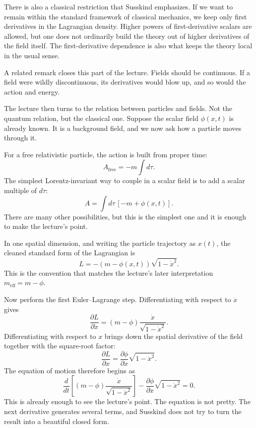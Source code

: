 There is also a classical restriction that Susskind emphasizes. If we want to remain within the standard framework of classical mechanics, we keep only first derivatives in the Lagrangian density. Higher powers of first-derivative scalars are allowed, but one does not ordinarily build the theory out of higher derivatives of the field itself. The first-derivative dependence is also what keeps the theory local in the usual sense.

A related remark closes this part of the lecture. Fields should be continuous. If a field were wildly discontinuous, its derivatives would blow up, and so would the action and energy.

The lecture then turns to the relation between particles and fields. Not the quantum relation, but the classical one. Suppose the scalar field \(\phi(x,t)\) is already known. It is a background field, and we now ask how a particle moves through it.

For a free relativistic particle, the action is built from proper time:
\begin{equation}
A_{\mathrm{free}}=-m\int d\tau.
\end{equation}
The simplest Lorentz-invariant way to couple in a scalar field is to add a scalar multiple of \(d\tau\):
\begin{equation}
A=\int d\tau\,[-m+\phi(x,t)].
\end{equation}
There are many other possibilities, but this is the simplest one and it is enough to make the lecture's point.

In one spatial dimension, and writing the particle trajectory as \(x(t)\), the cleaned standard form of the Lagrangian is
\begin{equation}
L=-(m-\phi(x,t))\sqrt{1-\dot x^2}.
\end{equation}
This is the convention that matches the lecture's later interpretation \(m_{\mathrm{eff}}=m-\phi\).

Now perform the first Euler--Lagrange step. Differentiating with respect to \(\dot x\) gives
\begin{equation}
\frac{\partial L}{\partial \dot x}
=
(m-\phi)\frac{\dot x}{\sqrt{1-\dot x^2}}.
\end{equation}
Differentiating with respect to \(x\) brings down the spatial derivative of the field together with the square-root factor:
\begin{equation}
\frac{\partial L}{\partial x}
=
\frac{\partial\phi}{\partial x}\sqrt{1-\dot x^2}.
\end{equation}
The equation of motion therefore begins as
\begin{equation}
\frac{d}{dt}
\left[
(m-\phi)\frac{\dot x}{\sqrt{1-\dot x^2}}
\right]
-
\frac{\partial\phi}{\partial x}\sqrt{1-\dot x^2}
=0.
\end{equation}
This is already enough to see the lecture's point. The equation is not pretty. The next derivative generates several terms, and Susskind does not try to turn the result into a beautiful closed form.

